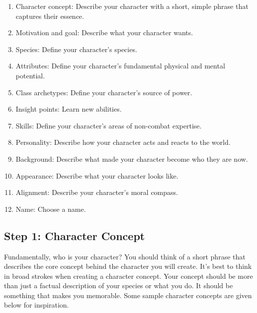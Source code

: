     \begin{enumerate}
        \item Character concept: Describe your character with a short, simple phrase that captures their essence.
        \item Motivation and goal: Describe what your character wants.

        \item Species: Define your character's species.
        \item Attributes: Define your character's fundamental physical and mental potential.
        \item Class archetypes: Define your character's source of power.
        \item Insight points: Learn new abilities.
        \item Skills: Define your character's areas of non-combat expertise.

        \item Personality: Describe how your character acts and reacts to the world.
        \item Background: Describe what made your character become who they are now.
        \item Appearance: Describe what your character looks like.
        \item Alignment: Describe your character's moral compass.
        \item Name: Choose a name.
    \end{enumerate}

    \subsection{Step 1: Character Concept}

        Fundamentally, who is your character?
        You should think of a short phrase that describes the core concept behind the character you will create.
        It's best to think in broad strokes when creating a character concept.
        Your concept should be more than just a factual description of your species or what you do.
        It should be something that makes you memorable.
        Some sample character concepts are given below for inspiration.

